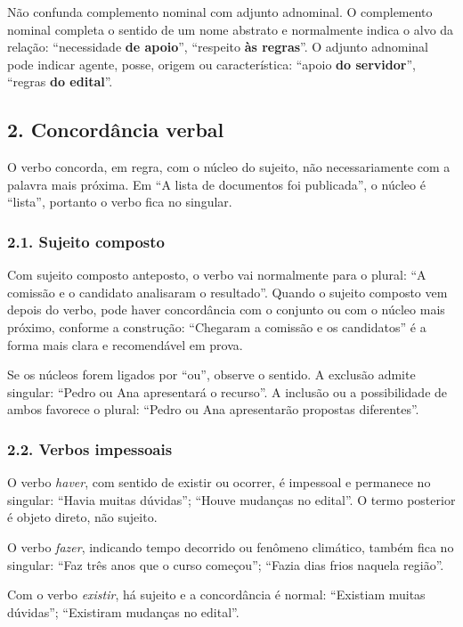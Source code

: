 \documentclass[11pt,a4paper]{article}
\begin{document}
Não confunda complemento nominal com adjunto adnominal. O complemento nominal completa o sentido de um nome abstrato e normalmente indica o alvo da relação: “necessidade \textbf{de apoio}”, “respeito \textbf{às regras}”. O adjunto adnominal pode indicar agente, posse, origem ou característica: “apoio \textbf{do servidor}”, “regras \textbf{do edital}”.

\subsection*{2. Concordância verbal}

O verbo concorda, em regra, com o núcleo do sujeito, não necessariamente com a palavra mais próxima. Em “A lista de documentos foi publicada”, o núcleo é “lista”, portanto o verbo fica no singular.

\subsubsection*{2.1. Sujeito composto}

Com sujeito composto anteposto, o verbo vai normalmente para o plural: “A comissão e o candidato analisaram o resultado”. Quando o sujeito composto vem depois do verbo, pode haver concordância com o conjunto ou com o núcleo mais próximo, conforme a construção: “Chegaram a comissão e os candidatos” é a forma mais clara e recomendável em prova.

Se os núcleos forem ligados por “ou”, observe o sentido. A exclusão admite singular: “Pedro ou Ana apresentará o recurso”. A inclusão ou a possibilidade de ambos favorece o plural: “Pedro ou Ana apresentarão propostas diferentes”.

\subsubsection*{2.2. Verbos impessoais}

O verbo \textit{haver}, com sentido de existir ou ocorrer, é impessoal e permanece no singular: “Havia muitas dúvidas”; “Houve mudanças no edital”. O termo posterior é objeto direto, não sujeito.

O verbo \textit{fazer}, indicando tempo decorrido ou fenômeno climático, também fica no singular: “Faz três anos que o curso começou”; “Fazia dias frios naquela região”.

Com o verbo \textit{existir}, há sujeito e a concordância é normal: “Existiam muitas dúvidas”; “Existiram mudanças no edital”.
\end{document}
